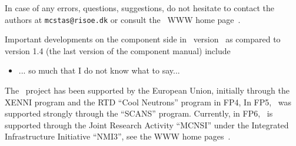 In case of any errors, questions, suggestions, 
do not hesitate to 
contact the authors at \verb+mcstas@risoe.dk+
or consult the \MCS\ WWW home page~\cite{mcstas_webpage}.

Important developments on the component side in \MCS\ version \version\ 
as compared to version 1.4 (the last version of the component manual) include

\begin{itemize}
\item ... so much that I do not know what to say...
\end{itemize} 

The \MCS\ project has been supported by the European Union, initially
through the XENNI program and the RTD ``Cool Neutrons'' program in FP4,
In FP5, \MCS\ was supported strongly through the
``SCANS'' program. 
Currently, in FP6, \MCS\ is supported through the Joint Research Activity
``MCNSI'' under the Integrated Infrastructure Initiative ``NMI3'', see
the WWW home pages~\cite{mcnsi_webpage,nmi3_webpage}.






